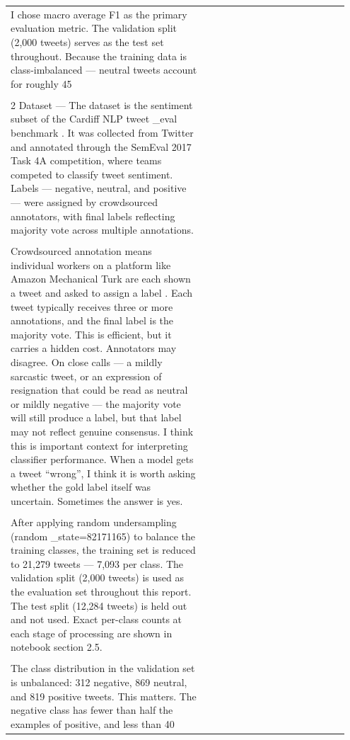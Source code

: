 \documentclass[11pt]{article}
\begin{document}
\begin{longtable}{|p{0.55\linewidth}|p{0.40\linewidth}|}
\hline
\rule{0pt}{3.5cm} & \\
\hline
I chose macro average F1 as the primary evaluation metric. The validation split (2,000 tweets) serves as the test set throughout. Because the training data is class-imbalanced --- neutral tweets account for roughly 45 & \\[2pt]
\hline
\rule{0pt}{3.5cm} & \\
\hline
2 Dataset --- The dataset is the sentiment subset of the Cardiff NLP tweet \_eval benchmark . It was collected from Twitter and annotated through the SemEval 2017 Task 4A competition, where teams competed to classify tweet sentiment. Labels --- negative, neutral, and positive --- were assigned by crowdsourced annotators, with final labels reflecting majority vote across multiple annotations. & \\[2pt]
\hline
\rule{0pt}{3.5cm} & \\
\hline
Crowdsourced annotation means individual workers on a platform like Amazon Mechanical Turk are each shown a tweet and asked to assign a label . Each tweet typically receives three or more annotations, and the final label is the majority vote. This is efficient, but it carries a hidden cost. Annotators may disagree. On close calls --- a mildly sarcastic tweet, or an expression of resignation that could be read as neutral or mildly negative --- the majority vote will still produce a label, but that label may not reflect genuine consensus. I think this is important context for interpreting classifier performance. When a model gets a tweet ``wrong'', I think it is worth asking whether the gold label itself was uncertain. Sometimes the answer is yes. & \\[2pt]
\hline
\rule{0pt}{3.5cm} & \\
\hline
After applying random undersampling (random \_state=82171165) to balance the training classes, the training set is reduced to 21,279 tweets --- 7,093 per class. The validation split (2,000 tweets) is used as the evaluation set throughout this report. The test split (12,284 tweets) is held out and not used. Exact per-class counts at each stage of processing are shown in notebook section 2.5. & \\[2pt]
\hline
\rule{0pt}{3.5cm} & \\
\hline
The class distribution in the validation set is unbalanced: 312 negative, 869 neutral, and 819 positive tweets. This matters. The negative class has fewer than half the examples of positive, and less than 40 & \\[2pt]

\end{longtable}
\end{document}
